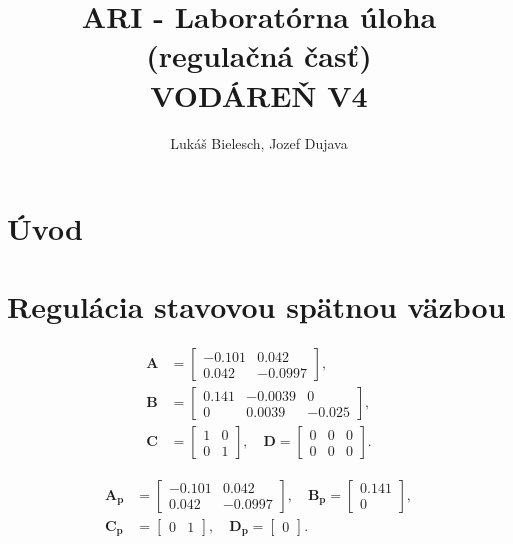 \documentclass[journal]{IEEEtran}
\begin{document}
	\author{{\large Lukáš Bielesch, Jozef Dujava}}
\title{{\Large ARI - Laboratórna úloha (regulačná časť)} \\[10pt]
	   \huge\uppercase{vodáreŇ V4}}

\maketitle
\section{Úvod}

\section{Regulácia stavovou spätnou väzbou}
	\begin{align}
	\bm{A} &= 
	{\begin{bmatrix} 
-0.101 & 0.042\\ 0.042 & -0.0997
		\end{bmatrix}},
	\nonumber \\[10pt] 
	\bm{B} &= 
	{\begin{bmatrix} 
	0.141 & -0.0039 & 0\\ 0 & 0.0039 & -0.025
		\end{bmatrix}},
	\nonumber \\[10pt]
	\bm{C} &= \begin{bmatrix} 1 & 0\\ 0 & 1
	 \end{bmatrix},
	\quad
	\bm{D} = \begin{bmatrix} 0 & 0 & 0\\ 0 & 0 & 0 \end{bmatrix}.
	\end{align}
	
	
		
	\begin{align}
	\bm{A_p} &= 
	{\begin{bmatrix} 
-0.101 & 0.042\\ 0.042 & -0.0997
		\end{bmatrix}},
	\nonumber 
	\quad\bm{B_p} = 
	{\begin{bmatrix} 
	0.141\\ 0 
		\end{bmatrix}},
	\nonumber \\[10pt]
	\bm{C_p} &= \begin{bmatrix} 0 & 1
	\end{bmatrix},
	\quad
	\bm{D_p} = \begin{bmatrix} 0 \end{bmatrix}.
	\end{align}
\end{document}
